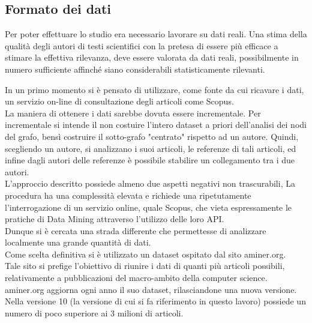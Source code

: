 \documentclass[a4paper, 12pt]{article}
\begin{document}
\subsection{Formato dei dati}
Per poter effettuare lo studio era necessario lavorare su dati reali. Una stima della qualità degli autori di testi scientifici con la pretesa di essere più efficace a stimare la effettiva rilevanza, deve essere valorata da dati reali, possibilmente in numero sufficiente affinché siano considerabili statisticamente rilevanti.
\par
In un primo momento si è pensato di utilizzare, come fonte da cui ricavare i dati, un servizio on-line di consultazione degli articoli come Scopus. \\ 
La maniera di ottenere i dati sarebbe dovuta essere incrementale.
Per incrementale si intende il non costuire l'intero dataset a priori dell'analisi dei nodi del grafo, bensì costruire il sotto-grafo "centrato" rispetto ad un autore.
Quindi, scegliendo un autore, si analizzano i suoi articoli, le referenze di tali articoli, ed infine dagli autori delle referenze è possibile stabilire un collegamento tra i due autori. \\
L'approccio descritto possiede almeno due aspetti negativi non trascurabili,
La procedura ha una complessità elevata e richiede una ripetutamente l'interrogazione di un servizio online, quale Scopus, che vieta espressamente le pratiche di Data Mining attraverso l'utilizzo delle loro API. \\
Dunque si è cercata una strada differente che permettesse di analizzare localmente una grande quantità di dati. \\
Come scelta definitiva si è utilizzato un dataset ospitato dal sito aminer.org. \\
Tale sito si prefige l'obiettivo di riunire i dati di quanti più articoli possibili, relativamente a pubblicazioni del macro-ambito della computer science.
aminer.org aggiorna ogni anno il suo dataset, rilasciandone una nuova versione. Nella versione 10 (la versione di cui si fa riferimento in questo lavoro) possiede un numero di poco superiore ai 3 milioni di articoli. \\
\end{document}
